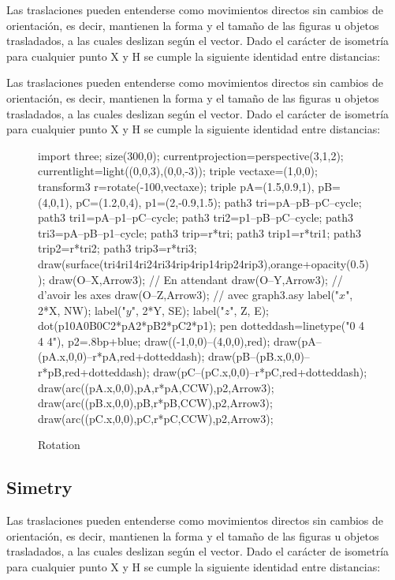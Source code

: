  Las traslaciones pueden entenderse como movimientos directos sin cambios de orientación, es decir, mantienen la forma y el tamaño de las figuras u objetos trasladados, a las cuales deslizan según el vector. Dado el carácter de isometría para cualquier punto X y H se cumple la siguiente identidad entre distancias:

 Las traslaciones pueden entenderse como movimientos directos sin cambios de orientación, es decir, mantienen la forma y el tamaño de las figuras u objetos trasladados, a las cuales deslizan según el vector. Dado el carácter de isometría para cualquier punto X y H se cumple la siguiente identidad entre distancias:

\begin{figure}[!ht]
	\centering
	\begin{asy}
	import three;
	size(300,0);
	currentprojection=perspective(3,1,2);
	currentlight=light((0,0,3),(0,0,-3));
	triple vectaxe=(1,0,0);
	transform3 r=rotate(-100,vectaxe);
	triple pA=(1.5,0.9,1), pB=(4,0,1), pC=(1.2,0,4), p1=(2,-0.9,1.5);
	path3 tri=pA--pB--pC--cycle;
	path3 tri1=pA--p1--pC--cycle;
	path3 tri2=p1--pB--pC--cycle;
	path3 tri3=pA--pB--p1--cycle;
	path3 trip=r*tri;
	path3 trip1=r*tri1;
	path3 trip2=r*tri2;
	path3 trip3=r*tri3;
	draw(surface(tri^^tri1^^tri2^^tri3^^trip^^trip1^^trip2^^trip3),orange+opacity(0.5));
	draw(O--X,Arrow3); // En attendant
	draw(O--Y,Arrow3); // d’avoir les axes
	draw(O--Z,Arrow3); // avec graph3.asy
	label("$x$", 2*X, NW);
	label("$y$", 2*Y, SE);
	label("$z$", Z, E);
	dot(p1^^pA^^pB^^pC^^r*pA^^r*pB^^r*pC^^r*p1);
	pen dotteddash=linetype("0 4 4 4"),
	p2=.8bp+blue;
	draw((-1,0,0)--(4,0,0),red);
	draw(pA--(pA.x,0,0)--r*pA,red+dotteddash);
	draw(pB--(pB.x,0,0)--r*pB,red+dotteddash);
	draw(pC--(pC.x,0,0)--r*pC,red+dotteddash);
	draw(arc((pA.x,0,0),pA,r*pA,CCW),p2,Arrow3);
	draw(arc((pB.x,0,0),pB,r*pB,CCW),p2,Arrow3);
	draw(arc((pC.x,0,0),pC,r*pC,CCW),p2,Arrow3);
	\end{asy}
	\caption{Rotation}
\end{figure}

\subsection{Simetry}

Las traslaciones pueden entenderse como movimientos directos sin cambios de orientación, es decir, mantienen la forma y el tamaño de las figuras u objetos trasladados, a las cuales deslizan según el vector. Dado el carácter de isometría para cualquier punto X y H se cumple la siguiente identidad entre distancias:

